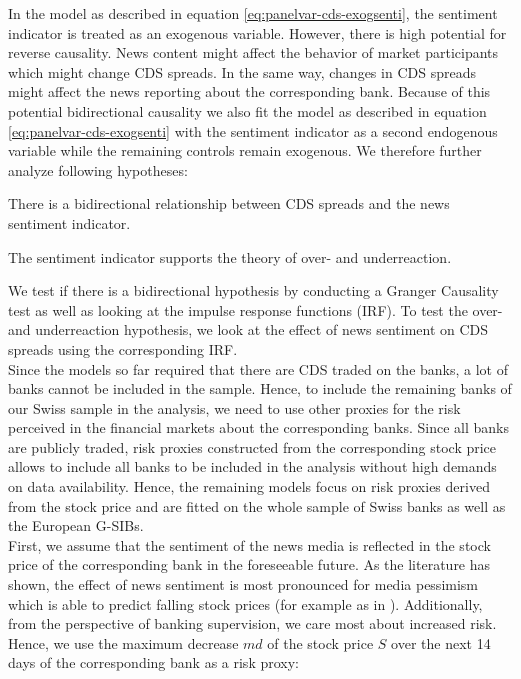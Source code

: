 In the model as described in equation \ref{eq:panelvar-cds-exogsenti}, the sentiment indicator is treated as an exogenous variable. However, there is high potential for reverse causality. News content might affect the behavior of market participants which might change CDS spreads. In the same way, changes in CDS spreads might affect the news reporting about the corresponding bank. Because of this potential bidirectional causality we also fit the model as described in equation \ref{eq:panelvar-cds-exogsenti} with the sentiment indicator as a second endogenous variable while the remaining controls remain exogenous. We therefore further analyze following hypotheses:

\begin{hyp}
	There is a bidirectional relationship between CDS spreads and the news sentiment indicator.
\end{hyp}

\begin{hyp}
	The sentiment indicator supports the theory of over- and underreaction.
\end{hyp}

We test if there is a bidirectional hypothesis by conducting a Granger Causality test as well as looking at the impulse response functions (IRF). To test the over- and underreaction hypothesis, we look at the effect of news sentiment on CDS spreads using the corresponding IRF. \\

Since the models so far required that there are CDS traded on the banks, a lot of banks cannot be included in the sample. Hence, to include the remaining banks of our Swiss sample in the analysis, we need to use other proxies for the risk perceived in the financial markets about the corresponding banks. Since all banks are publicly traded, risk proxies constructed from the corresponding stock price allows to include all banks to be included in the analysis without high demands on data availability. Hence, the remaining models focus on risk proxies derived from the stock price and are fitted on the whole sample of Swiss banks as well as the European G-SIBs. \\

First, we assume that the sentiment of the news media is reflected in the stock price of the corresponding bank in the foreseeable future. As the literature has shown, the effect of news sentiment is most pronounced for media pessimism which is able to predict falling stock prices (for example as in \cite{tetlock2007}). Additionally, from the perspective of banking supervision, we care most about increased risk. Hence, we use the maximum decrease $md$ of the stock price $S$ over the next 14 days of the corresponding bank as a risk proxy:

